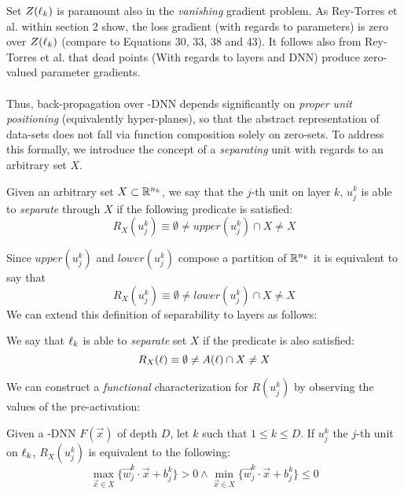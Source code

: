 Set $Z(\ell_k)$ is paramount also in the \emph{vanishing} gradient problem. As Rey-Torres et al. \cite{reyRiera2019ModellingClassificationReLU} within section 2 show, the loss gradient (with regards to parameters) is zero over $Z(\ell_k)$ (compare to Equations 30, 33, 38 and 43). It follows also from Rey-Torres et al.  \cite{reyRiera2019ModellingClassificationReLU} that dead points (With regards to layers and DNN) produce zero-valued parameter gradients.
\\\\
Thus, back-propagation over \ReLU-DNN depends significantly on \emph{proper unit positioning} (equivalently hyper-planes), so that the abstract representation of data-sets does not fall via function composition solely on zero-sets.  To address this formally, we introduce the concept of a \emph{separating} unit with regards to an arbitrary set $X$. 
\begin{definition}\label{def:separatingUnit}
Given an arbitrary set $X\subset\mathbb{R}^{n_k}$, we say that the $j$-th unit on layer $k$, $u_j^k$ is able to \emph{separate} through $X$ if the following predicate is satisfied:
\begin{equation}\label{eq:predicateWithUpper}
    R_X(u_j^k)\equiv \emptyset \neq upper(u_j^k) \cap X \neq X 
\end{equation}
\end{definition}
Since $upper(u_j^k)$ and $lower(u_j^k)$ compose a partition of $\mathbb{R}^{n_k}$ it is equivalent to say that 
\begin{equation}\label{eq:predicateWithLower}
    R_X(u_j^k)\equiv \emptyset \neq lower(u_j^k) \cap X \neq X 
\end{equation}
We can extend this definition of separability to layers as follows: 
\begin{proposition}\label{pro:separatingLayer}
We say that $\ell_k$ is able to \emph{separate} set $X$ if the predicate is also satisfied:
\begin{equation}\label{eq:predicateOverLayer}
    R_X(\ell) \equiv \emptyset \neq A(\ell)\cap X \neq X
\end{equation}
\end{proposition}
We can construct a \emph{functional} characterization for $R(u_j^k)$ by observing the values of the pre-activation:
\begin{remark}\label{rmk:separationUsingGeometry}
Given a \ReLU-DNN $F(\vec{x})$ of depth $D$, let $k$ such that $1\leq k \leq D$. If $u_j^k$ the $j$-th unit on $\ell_k$, $R_X(u_j^k)$ is equivalent to the following:
\begin{equation}
\displaystyle\max_{\vec{x}\in X}\{\vec{w}_j^k\cdot\vec{x}+b_j^k\} > 0
\wedge 
\displaystyle\min_{\vec{x}\in X}\{\vec{w}_j^k\cdot\vec{x}+b_j^k\} \leq 0
\end{equation}
\end{remark}
